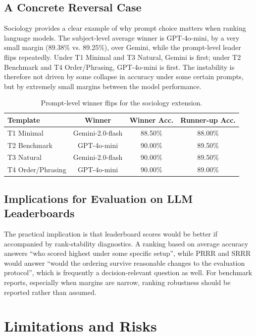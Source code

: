 \documentclass[11pt]{article}
\theoremstyle{definition}
\begin{document}
\subsection{A Concrete Reversal Case}

Sociology provides a clear example of why prompt choice matters when ranking language models. The subject-level average winner is GPT-4o-mini, by a very small margin (89.38\% vs. 89.25\%), over Gemini, while the prompt-level leader flips repeatedly. Under T1 Minimal and T3 Natural, Gemini is first; under T2 Benchmark and T4 Order/Phrasing, GPT-4o-mini is first. The instability is therefore not driven by some collapse in accuracy under some certain prompts, but by extremely small margins between the model performance.

\begin{table}[H]
\centering
\begin{tabular}{@{}lccc@{}}
\toprule
\textbf{Template} & \textbf{Winner} & \textbf{Winner Acc.} & \textbf{Runner-up Acc.} \\
\midrule
T1 Minimal & Gemini-2.0-flash & 88.50\% & 88.00\% \\
T2 Benchmark & GPT-4o-mini & 90.00\% & 89.50\% \\
T3 Natural & Gemini-2.0-flash & 90.00\% & 89.50\% \\
T4 Order/Phrasing & GPT-4o-mini & 90.00\% & 89.00\% \\
\bottomrule
\end{tabular}
\caption{Prompt-level winner flips for the sociology extension.}
\label{tab:sociology_case}
\end{table}

\subsection{Implications for Evaluation on LLM Leaderboards}

The practical implication is that leaderboard scores would be better if accompanied by rank-stability diagnostics. A ranking based on average accuracy answers ``who scored highest under some specific setup'', while PRRR and SRRR would answer ``would the ordering survive reasonable changes to the evaluation protocol'', which is frequently a decision-relevant question as well. For benchmark reports, especially when margins are narrow, ranking robustness should be reported rather than assumed.

\section{Limitations and Risks}
\end{document}
